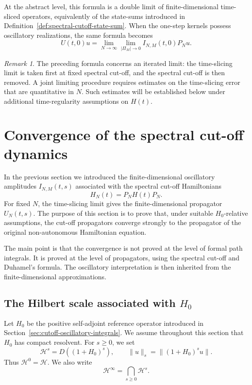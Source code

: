 \documentclass[11pt]{amsart}
\theoremstyle{plain}
\theoremstyle{definition}
\theoremstyle{remark}
\newtheorem{remark}[theorem]{Remark}
\newcommand{\Hilb}{\mathcal H}
\begin{document}
At the abstract level, this formula is a double limit of finite-dimensional
time-sliced operators, equivalently of the state-sums introduced in
Definition~\ref{def:spectral-cutoff-state-sum}. When the one-step kernels
possess oscillatory realizations, the same formula becomes
\[
U(t,0)u
=
\lim_{N\to\infty}
\lim_{|\Pi_{M}|\to 0}
I_{N,M}(t,0)P_{N}u.
\]

\begin{remark}
\label{rem:iterated-versus-joint-limit}
The preceding formula concerns an iterated limit: the time-slicing limit is
taken first at fixed spectral cut-off, and the spectral cut-off is then
removed. A joint limiting procedure requires estimates on the time-slicing
error that are quantitative in \(N\). Such estimates will be established
below under additional time-regularity assumptions on \(H(t)\).
\end{remark}
\section{Convergence of the spectral cut-off dynamics}
\label{sec:convergence-cutoff-dynamics}

In the previous section we introduced the finite-dimensional
oscillatory amplitudes \(I_{N,M}(t,s)\) associated with the spectral
cut-off Hamiltonians
\[
        H_N(t)=P_NH(t)P_N.
\]
For fixed \(N\), the time-slicing limit gives the finite-dimensional
propagator \(U_N(t,s)\).  The purpose of this section is to prove that,
under suitable \(H_0\)-relative assumptions, the cut-off propagators
converge strongly to the propagator of the original non-autonomous
Hamiltonian equation.

The main point is that the convergence is not proved at the level of
formal path integrals.  It is proved at the level of propagators, using
the spectral cut-off and Duhamel's formula.  The oscillatory
interpretation is then inherited from the finite-dimensional
approximations.

\subsection{The Hilbert scale associated with \(H_0\)}

Let \(H_0\) be the positive self-adjoint reference operator introduced
in Section~\ref{sec:cutoff-oscillatory-integrals}.  We assume throughout
this section that \(H_0\) has compact resolvent.  For \(s\geq0\), we set
\[
        \Hilb^s=D((1+H_0)^s),
        \qquad
        \|u\|_s=\|(1+H_0)^s u\|.
\]
Thus \(\Hilb^0=\Hilb\).  We also write
\[
        \Hilb^\infty=\bigcap_{s\geq0}\Hilb^s.
\]
\end{document}
